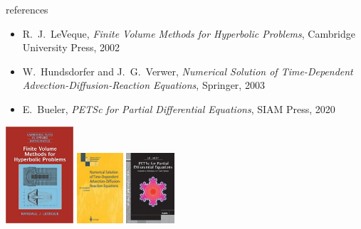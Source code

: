 \documentclass[10pt,dvipsnames,usepdftitle=false,
hyperref={pdftitle = {Finite volume methods},
    pdfauthor = {Ed Bueler}}]{beamer}
\begin{document}
\begin{frame}{references}
\begin{itemize}
\item {\large \alert{R.~J.~LeVeque, \emph{Finite Volume Methods for Hyperbolic Problems}, Cambridge University Press, 2002}}

\medskip
\item W.~Hundsdorfer and J.~G.~Verwer, \emph{Numerical Solution of Time-Dependent Advection-Diffusion-Reaction Equations}, Springer, 2003
\item E.~Bueler, \emph{PETSc for Partial Differential Equations}, SIAM Press, 2020
\end{itemize}

\bigskip

\begin{center}
\includegraphics[height=36mm]{figs/covers/leveque} \qquad \includegraphics[height=26mm]{figs/covers/hv} \qquad \includegraphics[height=26mm]{figs/covers/bueler}
\end{center}
\end{frame}
\end{document}

